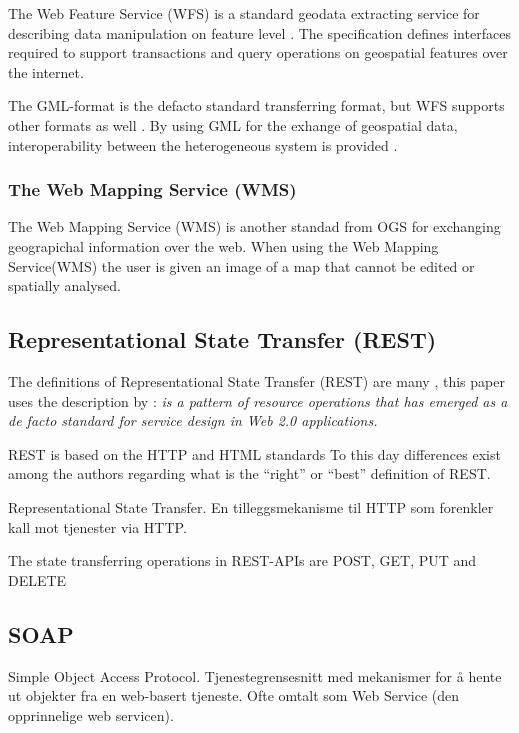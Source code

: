 The Web Feature Service (WFS) is a standard geodata extracting service for describing data manipulation on feature level \citep{Peng2005, Norgedigitalt2014}. The specification defines interfaces required to support transactions and query operations on geospatial features over the internet.

The GML-format is the defacto standard transferring format, but WFS supports other formats as well \citep{Eggan2017}. By using GML for the exhange of geospatial data,  interoperability between the heterogeneous system is provided \citep{YaoXiaobai2008Iimo}.

\subsubsection{The Web Mapping Service (WMS)}
The Web Mapping Service (WMS) is another standad from OGS for exchanging geograpichal information over the web. When using the Web Mapping Service(WMS) the user is given an image of a map that cannot be edited or spatially analysed. 	


\subsection{Representational State Transfer (REST)}
The definitions of Representational State Transfer (REST) are many \citep{Fielding, Richardson}, this paper uses the description by \cite{Battle2008}: \textit{ is a pattern of resource operations that has emerged as a de facto standard for service design in Web 2.0 applications.} 


REST is based on the HTTP and HTML standards 
To this day differences exist among the authors regarding what
is the “right” or “best” definition of REST.

Representational State Transfer. En tilleggsmekanisme til HTTP som forenkler kall mot tjenester via HTTP. 

The state transferring operations in REST-APIs are POST, GET, PUT and DELETE

\subsection{SOAP}
Simple Object Access Protocol. Tjenestegrensesnitt med
mekanismer for å hente ut objekter fra en web-basert tjeneste.
Ofte omtalt som Web Service (den opprinnelige web servicen). 


